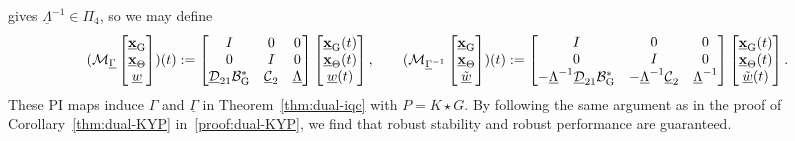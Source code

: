 gives $\underline\Lambda^{-1}\in\Pi_4$, so we may define
\begin{equation*}
(\mathcal{M}_{\underline\Gamma}
\begin{bmatrix}\underline{\mathbf{x}}_{{\mathrm{G}}}\\\underline{\mathbf{x}}_\Theta\\\underline w\end{bmatrix})(t)
:=\begin{bmatrix}
I&0&0\\
0&I&0\\
\underline{\mathcal{D}}_{21}\mathcal{B}_{{\mathrm{G}}}^*&\underline{\mathcal{C}}_2&\underline\Lambda
\end{bmatrix}\begin{bmatrix}\underline{\mathbf{x}}_{{\mathrm{G}}}(t)\\\underline{\mathbf{x}}_\Theta(t)\\\underline w(t)\end{bmatrix},\qquad
(\mathcal{M}_{\underline\Gamma^{-1}}
\begin{bmatrix}\underline{\mathbf{x}}_{{\mathrm{G}}}\\\underline{\mathbf{x}}_\Theta\\\tilde{\underline w}\end{bmatrix})(t)
:=\begin{bmatrix}
I&0&0\\
0&I&0\\
-\underline\Lambda^{-1}\underline{\mathcal{D}}_{21}\mathcal{B}_{{\mathrm{G}}}^*
&-\underline\Lambda^{-1}\underline{\mathcal{C}}_2&\underline\Lambda^{-1}
\end{bmatrix}\begin{bmatrix}\underline{\mathbf{x}}_{{\mathrm{G}}}(t)\\\underline{\mathbf{x}}_\Theta(t)\\\tilde{\underline w}(t)\end{bmatrix}.
\end{equation*}
These PI maps induce $\Gamma$ and $\underline\Gamma$ in
Theorem~\ref{thm:dual-iqc} with $P=K\star G$.
By following the same argument as in the proof of
Corollary~\ref{thm:dual-KYP} in~\ref{proof:dual-KYP}, we find that robust
stability and robust performance are guaranteed.
\par\endgroup
